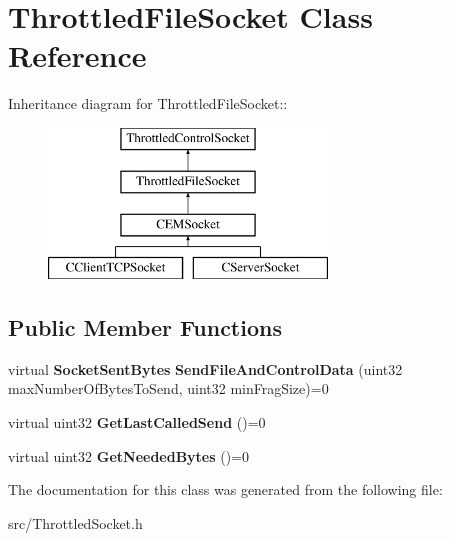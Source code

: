 \section{ThrottledFileSocket Class Reference}
\label{classThrottledFileSocket}
Inheritance diagram for ThrottledFileSocket::\begin{figure}[H]
\begin{center}
\leavevmode
\includegraphics[height=4cm]{classThrottledFileSocket}
\end{center}
\end{figure}
\subsection*{Public Member Functions}
\begin{DoxyCompactItemize}
\item 
virtual {\bf SocketSentBytes} {\bfseries SendFileAndControlData} (uint32 maxNumberOfBytesToSend, uint32 minFragSize)=0\label{classThrottledFileSocket_a9dcda7a1f43f9a3ce22127dc4a0e4bbc}

\item 
virtual uint32 {\bfseries GetLastCalledSend} ()=0\label{classThrottledFileSocket_ad801415745996c21fbf83a323eb370c9}

\item 
virtual uint32 {\bfseries GetNeededBytes} ()=0\label{classThrottledFileSocket_a3bb3aabfacddc52f9183c89b116208c9}

\end{DoxyCompactItemize}


The documentation for this class was generated from the following file:\begin{DoxyCompactItemize}
\item 
src/ThrottledSocket.h\end{DoxyCompactItemize}
